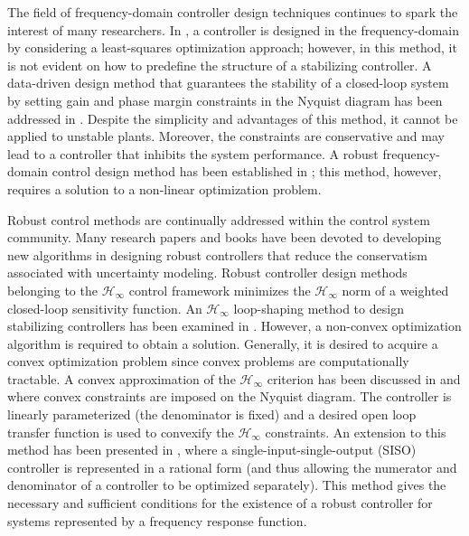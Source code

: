 \documentclass[a4paper, 10pt, conference]{ieeeconf}
\begin{document}
The field of frequency-domain controller design techniques continues to spark the interest of many researchers. In \cite{KNN13}, a controller is designed in the frequency-domain by considering a least-squares optimization approach; however, in this method, it is not evident on how to predefine the structure of a stabilizing controller. A data-driven design method that guarantees the stability of a closed-loop system by setting gain and phase margin constraints in the Nyquist diagram has been addressed in \cite{Sae13}. Despite the simplicity and advantages of this method, it cannot be applied to unstable plants. Moreover, the constraints are conservative and may lead to a controller that inhibits the system performance. %
A robust frequency-domain control design method has been established in \cite{KNDB13}; this method, however, requires a solution to a non-linear optimization problem. 

Robust control methods are continually addressed within the control system community. Many research papers and books have been devoted to developing new algorithms in designing robust controllers that reduce the conservatism associated with uncertainty modeling. Robust controller design methods belonging to the $\mathcal{H}_{\infty}$ control framework minimizes the $\mathcal{H}_{\infty}$ norm of a weighted closed-loop sensitivity function. An $\mathcal{H}_{\infty}$ loop-shaping method to design stabilizing controllers has been examined in \cite{YYH13}. However, a non-convex optimization algorithm is required to obtain a solution. Generally, it is desired to acquire a convex optimization problem since convex problems are computationally tractable. A convex approximation of the $\mathcal{H}_\infty$ criterion has been discussed in \cite{KG10} and \cite{KGL08} where convex constraints are imposed on the Nyquist diagram. The controller is linearly parameterized (the denominator is fixed) and a desired open loop transfer function is used to convexify the $\mathcal{H}_{\infty}$ constraints.  An extension to this method has been presented in \cite{KZ04}, where a single-input-single-output (SISO) controller is represented in a rational form (and thus allowing the numerator and denominator of a controller to be optimized separately). This method gives the necessary and sufficient conditions for the existence of a robust controller for systems represented by a frequency response function.
\end{document}
